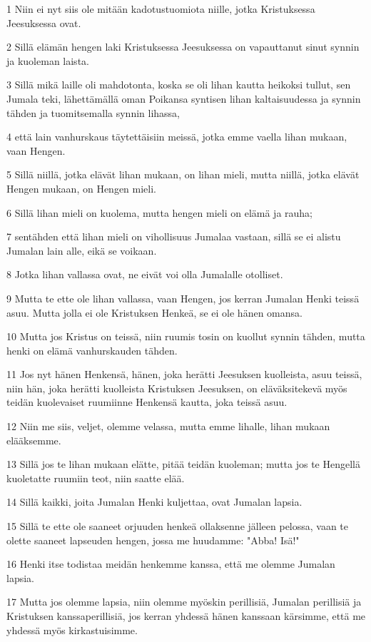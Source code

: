 \par 1 Niin ei nyt siis ole mitään kadotustuomiota niille, jotka Kristuksessa Jeesuksessa ovat.
\par 2 Sillä elämän hengen laki Kristuksessa Jeesuksessa on vapauttanut sinut synnin ja kuoleman laista.
\par 3 Sillä mikä laille oli mahdotonta, koska se oli lihan kautta heikoksi tullut, sen Jumala teki, lähettämällä oman Poikansa syntisen lihan kaltaisuudessa ja synnin tähden ja tuomitsemalla synnin lihassa,
\par 4 että lain vanhurskaus täytettäisiin meissä, jotka emme vaella lihan mukaan, vaan Hengen.
\par 5 Sillä niillä, jotka elävät lihan mukaan, on lihan mieli, mutta niillä, jotka elävät Hengen mukaan, on Hengen mieli.
\par 6 Sillä lihan mieli on kuolema, mutta hengen mieli on elämä ja rauha;
\par 7 sentähden että lihan mieli on vihollisuus Jumalaa vastaan, sillä se ei alistu Jumalan lain alle, eikä se voikaan.
\par 8 Jotka lihan vallassa ovat, ne eivät voi olla Jumalalle otolliset.
\par 9 Mutta te ette ole lihan vallassa, vaan Hengen, jos kerran Jumalan Henki teissä asuu. Mutta jolla ei ole Kristuksen Henkeä, se ei ole hänen omansa.
\par 10 Mutta jos Kristus on teissä, niin ruumis tosin on kuollut synnin tähden, mutta henki on elämä vanhurskauden tähden.
\par 11 Jos nyt hänen Henkensä, hänen, joka herätti Jeesuksen kuolleista, asuu teissä, niin hän, joka herätti kuolleista Kristuksen Jeesuksen, on eläväksitekevä myös teidän kuolevaiset ruumiinne Henkensä kautta, joka teissä asuu.
\par 12 Niin me siis, veljet, olemme velassa, mutta emme lihalle, lihan mukaan elääksemme.
\par 13 Sillä jos te lihan mukaan elätte, pitää teidän kuoleman; mutta jos te Hengellä kuoletatte ruumiin teot, niin saatte elää.
\par 14 Sillä kaikki, joita Jumalan Henki kuljettaa, ovat Jumalan lapsia.
\par 15 Sillä te ette ole saaneet orjuuden henkeä ollaksenne jälleen pelossa, vaan te olette saaneet lapseuden hengen, jossa me huudamme: "Abba! Isä!"
\par 16 Henki itse todistaa meidän henkemme kanssa, että me olemme Jumalan lapsia.
\par 17 Mutta jos olemme lapsia, niin olemme myöskin perillisiä, Jumalan perillisiä ja Kristuksen kanssaperillisiä, jos kerran yhdessä hänen kanssaan kärsimme, että me yhdessä myös kirkastuisimme.
